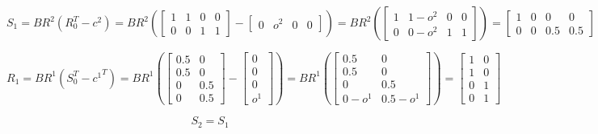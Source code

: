 \documentclass{article}
\begin{document}
\begin{equation*}
S_1=
BR^2(R_0^T-c^2)=
BR^2(
\begin{bmatrix}
1 & 1 & 0 & 0\\
0 & 0 & 1 & 1
\end{bmatrix}
-
\begin{bmatrix}
0 & o^2 & 0 & 0
\end{bmatrix}
)
=
BR^2(
\begin{bmatrix}
 1      & 1-o^2   & 0  & 0   \\
0     & 0-o^2   & 1      & 1 
\end{bmatrix}
)
=
\begin{bmatrix}
1 & 0 & 0 & 0\\
0 & 0 & 0.5 & 0.5
\end{bmatrix}
\end{equation*}

\begin{equation*}
R_1=
BR^1(S_0^T-{c^1}^T)=
BR^1(
\begin{bmatrix}
0.5 & 0\\
0.5 & 0\\
0 & 0.5\\
0 & 0.5
\end{bmatrix}
-
\begin{bmatrix}
0 \\
0 \\
0 \\
o^1
\end{bmatrix}
)
=
BR^1(
\begin{bmatrix}
0.5 & 0\\
0.5 & 0\\
0 & 0.5\\
0-o^1 & 0.5-o^1
\end{bmatrix}
)
=
\begin{bmatrix}
1 & 0\\
1 & 0\\
0 & 1\\
0 & 1
\end{bmatrix}
\end{equation*}

\begin{equation*}
S_2=S_1
\end{equation*}
\end{document}
